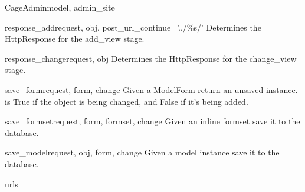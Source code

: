 \documentclass[letterpaper,10pt,english]{sphinxmanual}
\begin{document}
\begin{classdesc}{CageAdmin}{model, admin\_site}
\hypertarget{animal.admin.CageAdmin.response_add}{}\begin{methoddesc}{response\_add}{request, obj, post\_url\_continue='../\%s/'}
Determines the HttpResponse for the add\_view stage.
\end{methoddesc}

\hypertarget{animal.admin.CageAdmin.response_change}{}\begin{methoddesc}{response\_change}{request, obj}
Determines the HttpResponse for the change\_view stage.
\end{methoddesc}

\hypertarget{animal.admin.CageAdmin.save_form}{}\begin{methoddesc}{save\_form}{request, form, change}
Given a ModelForm return an unsaved instance.  is True if
the object is being changed, and False if it's being added.
\end{methoddesc}

\hypertarget{animal.admin.CageAdmin.save_formset}{}\begin{methoddesc}{save\_formset}{request, form, formset, change}
Given an inline formset save it to the database.
\end{methoddesc}

\hypertarget{animal.admin.CageAdmin.save_model}{}\begin{methoddesc}{save\_model}{request, obj, form, change}
Given a model instance save it to the database.
\end{methoddesc}

\hypertarget{animal.admin.CageAdmin.urls}{}\begin{memberdesc}{urls}\end{memberdesc}
\end{classdesc}
\end{document}

